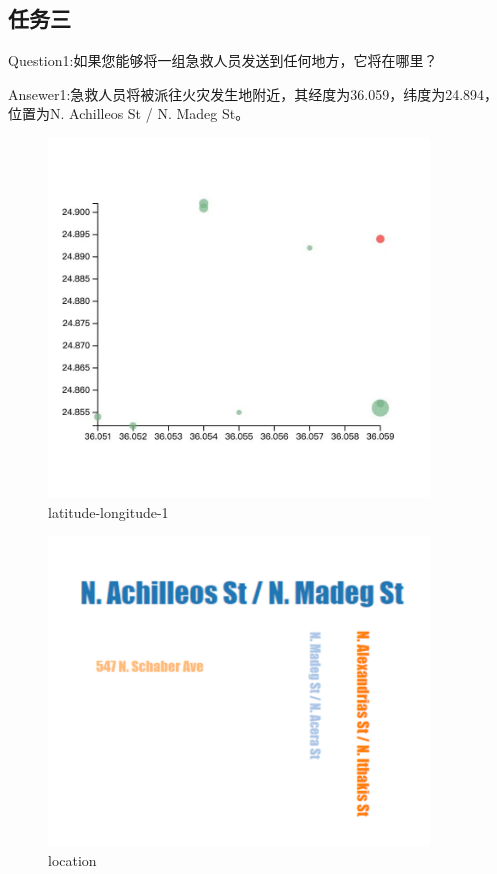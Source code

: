 \documentclass[a4paper]{article}
\begin{document}
\subsection{任务三}
Question1:如果您能够将一组急救人员发送到任何地方，它将在哪里？

Ansewer1:急救人员将被派往火灾发生地附近，其经度为36.059，纬度为24.894，位置为N. Achilleos St / N. Madeg St。

\begin{figure}[H]
  \centering
  \includegraphics[width=0.9\textwidth]{images/3-1}
  \caption{latitude-longitude-1}\label{fig:3-1}
  \vspace{\baselineskip}
\end{figure}

\begin{figure}[H]
  \centering
  \includegraphics[width=0.9\textwidth]{images/3-2.png}
  \caption{location}\label{fig:3-2}
  \vspace{\baselineskip}
\end{figure}
\end{document}
